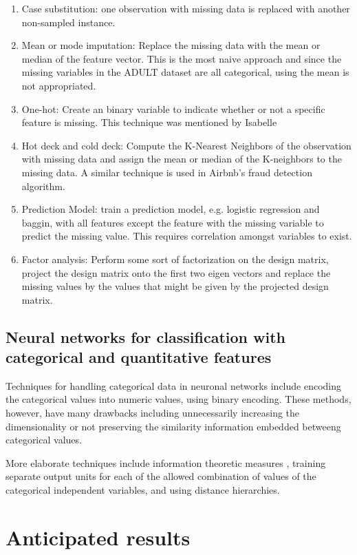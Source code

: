 \documentclass[12pt]{article}
\begin{document}
\begin{enumerate}
\item Case substitution: one observation with missing data is replaced with
    another non-sampled instance.
\item Mean or mode imputation: Replace the missing data with the mean or median of
    the feature vector. This is the most naive approach and since the missing
    variables in the ADULT dataset are all categorical, using the mean is not
    appropriated.
\item One-hot: Create an binary variable to indicate whether or not a specific
    feature is missing. This technique was mentioned by Isabelle
\item Hot deck and cold deck: Compute the K-Nearest Neighbors of the
    observation with missing data and assign the mean or median of the K-neighbors
    to the missing data. A similar technique is used in Airbnb's fraud detection
    algorithm.
\item Prediction Model: train a prediction model, e.g. logistic regression and
    baggin, with all features except the feature with the missing variable to
    predict the missing value. This requires correlation amongst variables to
    exist.
\item Factor analysis: Perform some sort of factorization on the design
    matrix, project the design matrix onto the first two eigen vectors and
    replace the missing values by the values that might be given by the
    projected design matrix.
\end{enumerate}

\subsection{Neural networks for classification with categorical and
quantitative features}  Techniques for handling categorical data in neuronal
networks include encoding the categorical values into numeric values, using
binary encoding. These methods, however, have many drawbacks including
unnecessarily increasing the dimensionality or not preserving the similarity
information embedded betweeng categorical values\cite{hsu2006generalizing}.

More elaborate techniques include information theoretic measures
\cite{wang2008categorical}, training separate output units for
each of the allowed combination of values of the categorical independent
variables\cite{brouwer2002feed}, and using distance
hierarchies\cite{hsu2006generalizing}.
\section{Anticipated results}
\end{document}
